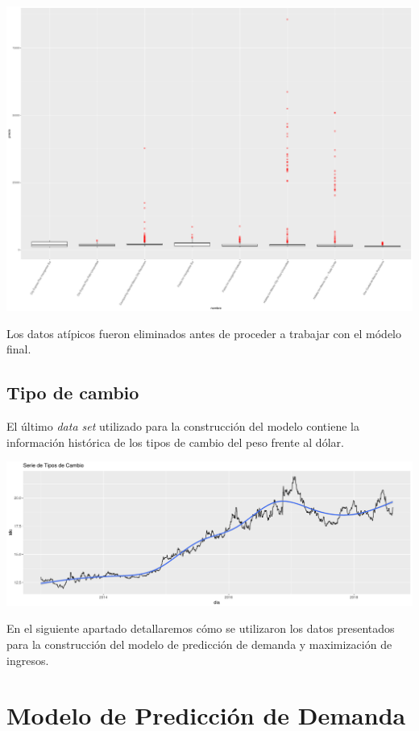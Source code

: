 \color{fgcolor}
\includegraphics[width=\maxwidth]{figures/PreciosBoxPlot-1} 

Los datos atípicos fueron eliminados antes de proceder a trabajar con el módelo final.

\subsection*{Tipo de cambio}

El último \emph{data set} utilizado para la construcción del modelo contiene la información histórica de los tipos de cambio del peso frente al dólar.

\color{fgcolor}
\includegraphics[width=\maxwidth]{figures/TiposdeCambio-1} 

En el siguiente apartado detallaremos cómo se utilizaron los datos presentados para la construcción del modelo de predicción de demanda y maximización de ingresos.


\section*{Modelo de Predicción de Demanda}


